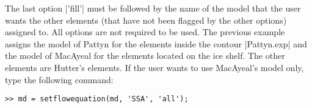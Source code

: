 The last option \lstinlinebg|'fill'| must be followed by the name of the model that the user wants the other elements (that have not been flagged by the other options) assigned to. All options are not required to be used. The previous example assigns the model of Pattyn for the elements inside the contour \lstinlinebg|Pattyn.exp| and the model of  MacAyeal for the elements located on the ice shelf. The other elements are Hutter's elements. If the user wants to use MacAyeal's model only, type the following command: 
\begin{lstlisting}
>> md = setflowequation(md, 'SSA', 'all');
\end{lstlisting}

\clearpage %
